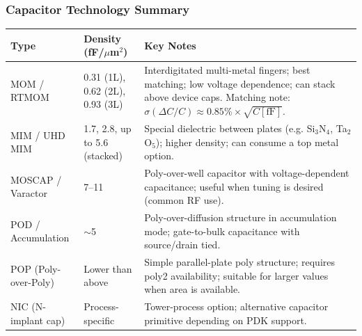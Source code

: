 \documentclass[aspectratio=169]{beamer}
\begin{document}
\begin{frame}
  \frametitle{Capacitor Technology Summary}
  \tiny
  \begin{center}
    \begin{tabular}{p{2.0cm}|p{2.0cm}|p{6.8cm}}
      \hline
      \textbf{Type} & \textbf{Density (fF/$\mu$m$^2$)} & \textbf{Key Notes} \\
      \hline
      MOM / RTMOM &
      0.31 (1L), 0.62 (2L), 0.93 (3L) &
      Interdigitated multi-metal fingers; best matching; low voltage dependence; can stack above device caps. Matching note: $\sigma(\Delta C/C)\approx 0.85\% \times \sqrt{C[\mathrm{fF}]}$. \\
      \hline
      MIM / UHD MIM &
      1.7, 2.8, up to 5.6 (stacked) &
      Special dielectric between plates (e.g. Si$_3$N$_4$, Ta$_2$O$_5$); higher density; can consume a top metal option. \\
      \hline
      MOSCAP / Varactor &
      7--11 &
      Poly-over-well capacitor with voltage-dependent capacitance; useful when tuning is desired (common RF use). \\
      \hline
      POD / Accumulation &
      $\sim$5 &
      Poly-over-diffusion structure in accumulation mode; gate-to-bulk capacitance with source/drain tied. \\
      \hline
      POP (Poly-over-Poly) &
      Lower than above &
      Simple parallel-plate poly structure; requires poly2 availability; suitable for larger values when area is available. \\
      \hline
      NIC (N-implant cap) &
      Process-specific &
      Tower-process option; alternative capacitor primitive depending on PDK support. \\
      \hline
    \end{tabular}
  \end{center}
\end{frame}
\end{document}
